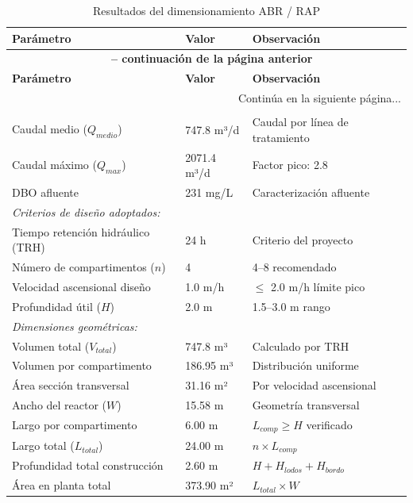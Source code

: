 \documentclass[12pt,a4paper]{article}
\begin{document}
\begin{longtable}{p{6cm}p{3cm}p{5cm}}
\caption{Resultados del dimensionamiento ABR / RAP} \\
\toprule
\textbf{Parámetro} & \textbf{Valor} & \textbf{Observación} \\
\midrule
\endfirsthead
\multicolumn{3}{c}{
    {\bfseries \tablename\ \thetable{} -- continuación de la página anterior}
} \\
\toprule
\textbf{Parámetro} & \textbf{Valor} & \textbf{Observación} \\
\midrule
\endhead
\midrule
\multicolumn{3}{r}{Continúa en la siguiente página...} \\
\endfoot
\bottomrule
\endlastfoot

\multicolumn{3}{l}{\textit{Parámetros de entrada:}} \\
Caudal medio ($Q_{medio}$) & 747.8 m³/d & Caudal por línea de tratamiento \\
Caudal máximo ($Q_{max}$) & 2071.4 m³/d & Factor pico: 2.8 \\
DBO afluente & 231 mg/L & Caracterización afluente \\
\midrule

\multicolumn{3}{l}{\textit{Criterios de diseño adoptados:}} \\
Tiempo retención hidráulico (TRH) & 24 h & Criterio del proyecto \\
Número de compartimentos ($n$) & 4 & 4--8 recomendado \\
Velocidad ascensional diseño & 1.0 m/h & $\leq$ 2.0 m/h límite pico \\
Profundidad útil ($H$) & 2.0 m & 1.5--3.0 m rango \\
\midrule

\multicolumn{3}{l}{\textit{Dimensiones geométricas:}} \\
Volumen total ($V_{total}$) & 747.8 m³ & Calculado por TRH \\
Volumen por compartimento & 186.95 m³ & Distribución uniforme \\
Área sección transversal & 31.16 m² & Por velocidad ascensional \\
Ancho del reactor ($W$) & 15.58 m & Geometría transversal \\
Largo por compartimento & 6.00 m & $L_{comp} \geq H$ verificado \\
Largo total ($L_{total}$) & 24.00 m & $n \times L_{comp}$ \\
Profundidad total construcción & 2.60 m & $H + H_{lodos} + H_{bordo}$ \\
Área en planta total & 373.90 m² & $L_{total} \times W$ \\
\midrule


\end{longtable}
\end{document}

